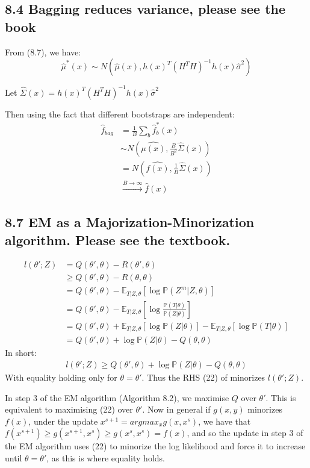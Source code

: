 \subsection*{8.4 Bagging reduces variance, please see the book}
From (8.7), we have:
$$\hat{\mu}^*(x) \sim N(\hat{\mu}(x), h(x)^T (H^T H)^{-1}h(x) \hat{\sigma}^2)$$

Let $\hat{\Sigma}(x) = h(x)^T (H^T H)^{-1}h(x) \hat{\sigma}^2$

Then using the fact that different bootstraps are independent:
\begin{align*}
    \hat{f}_{bag} &= \frac{1}{B} \sum_{b} \hat{f}^*_b(x) \\
     &\sim N(\hat{\mu(x)}, \frac{B}{B^2} \hat{\Sigma}(x)) \\
     &= N(\hat{f(x)}, \frac{1}{B} \hat{\Sigma}(x))\\
     &\xrightarrow{B\to\infty} \hat{f}(x)
\end{align*}

\subsection*{8.7 EM as a Majorization-Minorization algorithm. Please see the textbook.}


\begin{align*}
    l(\theta'; Z) &= Q(\theta', \theta) - R(\theta', \theta) \\
    &\geq Q(\theta', \theta) - R(\theta, \theta) \\
   &= Q(\theta', \theta) - \mathbb{E}_{T|Z, \theta}\left[\log \mathbb{P}\left(Z^m|Z, \theta\right)\right]\\
   &= Q(\theta', \theta) - \mathbb{E}_{T|Z, \theta}\left[\log \frac{\mathbb{P}\left(T|\theta\right)}{\mathbb{P}\left(Z|\theta\right)}\right] \\
   &= Q(\theta', \theta) + \mathbb{E}_{T|Z, \theta}\left[\log \mathbb{P}\left(Z|\theta\right)\right]- \mathbb{E}_{T|Z, \theta}\left[\log \mathbb{P}\left(T|\theta\right)\right]\\
   &= Q(\theta', \theta) + \log \mathbb{P}\left(Z|\theta\right) - Q(\theta, \theta)
\end{align*}
In short:
\begin{align}
l(\theta'; Z) \geq Q(\theta', \theta) + \log \mathbb{P}\left(Z|\theta\right) - Q(\theta, \theta)
\end{align}
With equality holding only for $\theta = \theta'$. Thus the RHS (22) of minorizes $l(\theta'; Z)$.

In step 3 of the EM algorithm (Algorithm 8.2), we maximise $Q$ over $\theta'$. This is equivalent to maximising (22) over $\theta'$.
Now in general if $g(x,y)$ minorizes $f(x)$, under the update $x^{s+1} = argmax_x g(x,x^s)$,
we have that $f(x^{s+1}) \geq g(x^{s+1},x^s)\geq g(x^s,x^s) = f(x)$, and so the update in step 3 of the EM algorithm uses (22)  to minorize the log likelihood and force it to increase until $\theta = \theta'$, as this is where equality holds.
